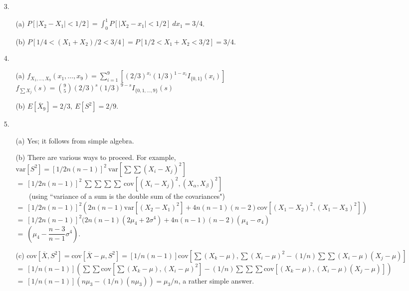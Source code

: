 \begin{enumerate}
	\item[3.] \begin{enumerate}
		\item[(a)] $P[\left\vert X_2-X_1\right\vert <1/2] = \displaystyle\int_0^1 P[\left\vert X_2-x_1\right\vert<1/2]\ dx_1 = 3/4$. 
		\item[(b)] $P[1/4 < (X_1+X_2)/2 <3/4] = P[1/2 < X_1+X_2 < 3/2] = 3/4$.
	\end{enumerate}

	\item[4.]  \begin{enumerate}
		\item[(a)] $f_{X_1,\ldots,X_9}(x_1,\ldots,x_9) = \sum\limits_{i=1}^{9}[(2/3)^{x_i}(1/3)^{1-x_i}I_{\{0,1\}}(x_i)]$ \\
		$f_{\sum X_j}(s) = \displaystyle {9\choose 5}(2/3)^s(1/3)^{9-s}I_{\{0,1,\ldots,9\}}(s)$
		\item[(b)] $E[\overline{X}_9]=2/3,\ E[S^2]=2/9$.
	\end{enumerate}

	\item[5.]  \begin{enumerate}
		\item[(a)] Yes; it follows from simple algebra.
		\item[(b)] There are various ways to proceed.  For example, \\
		$\mbox{var}[S^2]=[1/2n(n-1)]^2\ \mbox{var}[\sum\sum(X_i-X_j)^2]$ \\
		$=\ [1/2n(n-1)]^2\ \sum\sum\sum\sum\ \mbox{cov}[(X_i-X_j)^2, (X_\alpha,X_\beta)^2]$ \\
		$\phantom{=\ }$ (using ``variance of a sum is the double sum of the covariances") \\
		$=\ [1/2n(n-1)]^2(2n(n-1)\mbox{var}[(X_2-X_1)^2] + 4n(n-1)(n-2)\mbox{cov}[(X_1-X_2)^2,(X_1-X_3)^2])$ \\
		$=\ [1/2n(n-1)]^2(2n(n-1)(2\mu_4+2\sigma^4) + 4n(n-1)(n-2)(\mu_4-\sigma_4)$ \\
		$=\ (\mu_4 - \dfrac{n-3}{n-1}\sigma^4)$.
		\item[(c)] $\mbox{cov}[\overline{X},S^2] = \mbox{cov}[\overline{X}-\mu, S^2] = [1/n(n-1)]\mbox{cov}[\sum(X_k-\mu), \sum(X_i-\mu)^2-(1/n)\sum\sum(X_i-\mu)(X_j-\mu)]$ \\
		$=\ [1/n(n-1)](\sum\sum\mbox{cov}[\sum(X_k-\mu),(X_i-\mu)^2] - (1/n)\sum\sum\sum\mbox{cov}[(X_k-\mu),(X_i-\mu)(X_j-\mu)])$ \\
		$=\ [1/n(n-1)](n\mu_3 - (1/n)(n\mu_3)) = \mu_3/n$, a rather simple answer.
		\end{enumerate}


\end{enumerate}
